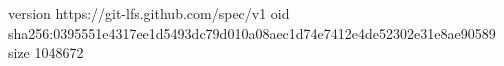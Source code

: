 version https://git-lfs.github.com/spec/v1
oid sha256:0395551e4317ee1d5493dc79d010a08aec1d74e7412e4de52302e31e8ae90589
size 1048672
